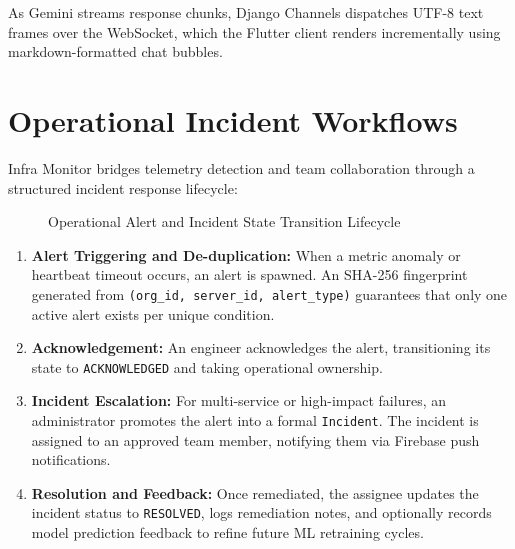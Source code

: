 As Gemini streams response chunks, Django Channels dispatches UTF-8 text frames over the WebSocket, which the Flutter client renders incrementally using markdown-formatted chat bubbles.

\section{Operational Incident Workflows}
Infra Monitor bridges telemetry detection and team collaboration through a structured incident response lifecycle:

\begin{figure}[H]
\centering
{}
\caption{Operational Alert and Incident State Transition Lifecycle}\label{fig:lifecycle}
\end{figure}

\begin{enumerate}
  \item \textbf{Alert Triggering and De-duplication:} When a metric anomaly or heartbeat timeout occurs, an alert is spawned. An SHA-256 fingerprint generated from \texttt{(org\_id, server\_id, alert\_type)} guarantees that only one active alert exists per unique condition.
  \item \textbf{Acknowledgement:} An engineer acknowledges the alert, transitioning its state to \texttt{ACKNOWLEDGED} and taking operational ownership.
  \item \textbf{Incident Escalation:} For multi-service or high-impact failures, an administrator promotes the alert into a formal \texttt{Incident}. The incident is assigned to an approved team member, notifying them via Firebase push notifications.
  \item \textbf{Resolution and Feedback:} Once remediated, the assignee updates the incident status to \texttt{RESOLVED}, logs remediation notes, and optionally records model prediction feedback to refine future ML retraining cycles.
\end{enumerate}
